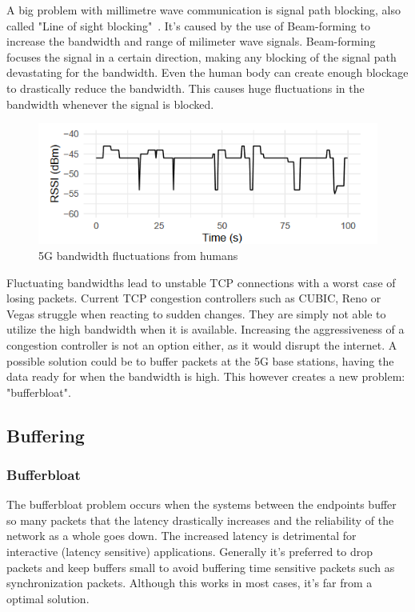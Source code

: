 \documentclass[a4paper,english, 11pt]{report}
\begin{document}
A big problem with millimetre wave communication is signal path blocking, also called "Line of sight blocking"~\cite{mmwave_blocking}. It's caused by the use of Beam-forming to increase the bandwidth and range of milimeter wave signals. Beam-forming focuses the signal in a certain direction, making any blocking of the signal path devastating for the bandwidth. Even the human body can create enough blockage to drastically reduce the bandwidth. This causes huge fluctuations in the bandwidth whenever the signal is blocked.\\
\begin{figure} %
	\centering
	\includegraphics[scale=1.25]{../diagrams/graphs/tcp_mmwave_blockage.png}
  	\caption{5G bandwidth fluctuations from humans}
  	\label{fig:blockage}
\end{figure}

Fluctuating bandwidths lead to unstable TCP connections with a worst case of losing packets. Current TCP congestion controllers such as CUBIC, Reno or Vegas struggle when reacting to sudden changes. They are simply not able to utilize the high bandwidth when it is available. Increasing the aggressiveness of a congestion controller is not an option either, as it would disrupt the internet. A possible solution could be to buffer packets at the 5G base stations, having the data ready for when the bandwidth is high. This however creates a new problem: "bufferbloat".


\subsection{Buffering}
\subsubsection{Bufferbloat}
The bufferbloat problem occurs when the systems between the endpoints buffer so many packets that the latency drastically increases and the reliability of the network as a whole goes down. The increased latency is detrimental for interactive (latency sensitive) applications. Generally it's preferred to drop packets and keep buffers small to avoid buffering time sensitive packets such as synchronization packets. Although this works in most cases, it's far from a optimal solution.\\
\end{document}
